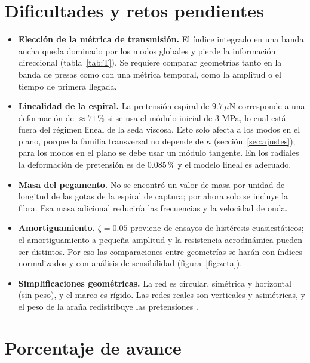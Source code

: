 \documentclass[11pt,letterpaper]{article}
\newcommand{\uN}{\,\mu\mathrm{N}}
\begin{document}
\section{Dificultades y retos pendientes}

\begin{itemize}
    \item \textbf{Elección de la métrica de transmisión.} El índice
    integrado en una banda ancha queda dominado por los modos globales y
    pierde la información direccional (tabla~\ref{tab:T}). Se requiere
    comparar geometrías tanto en la banda de presas como con una métrica
    temporal, como la amplitud o el tiempo de primera llegada.
    \item \textbf{Linealidad de la espiral.} La pretensión espiral de
    $9.7\uN$ corresponde a una deformación de $\approx71\,\%$ si se usa el
    módulo inicial de 3 MPa, lo cual está fuera del régimen lineal de la
    seda viscosa. Esto solo afecta a los modos en el plano, porque la
    familia transversal no depende de $\kappa$
    (sección~\ref{sec:ajustes}); para los modos en el plano se debe usar un
    módulo tangente. En los radiales la deformación de pretensión es de
    $0.085\,\%$ y el modelo lineal es adecuado.
    \item \textbf{Masa del pegamento.} No se encontró un valor de masa por
    unidad de longitud de las gotas de la espiral de captura; por ahora
    solo se incluye la fibra. Esa masa adicional reduciría las frecuencias
    y la velocidad de onda.
    \item \textbf{Amortiguamiento.} $\zeta=0.05$ proviene de ensayos de
    histéresis cuasiestáticos; el amortiguamiento a pequeña amplitud y la
    resistencia aerodinámica pueden ser distintos. Por eso las comparaciones
    entre geometrías se harán con índices normalizados y con análisis de
    sensibilidad (figura~\ref{fig:zeta}).
    \item \textbf{Simplificaciones geométricas.} La red es circular,
    simétrica y horizontal (sin peso), y el marco es rígido. Las redes
    reales son verticales y asimétricas, y el peso de la araña redistribuye
    las pretensiones \cite{yavuz2024}.
\end{itemize}

\section{Porcentaje de avance}\label{sec:porcentaje}
\end{document}
